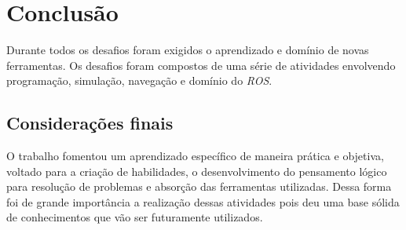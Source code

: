 \chapter{Conclusão}
\label{chap:conc}

Durante todos os desafios foram exigidos o aprendizado e domínio de novas ferramentas. Os desafios foram compostos de uma série de atividades envolvendo programação, simulação, navegação e domínio do \textit{ROS}. 



\section{Considerações finais}
\label{sec:consid}

O trabalho fomentou um aprendizado específico de maneira prática e objetiva, voltado para a criação de habilidades, o desenvolvimento do pensamento lógico para resolução de problemas e absorção das ferramentas utilizadas. Dessa forma foi de grande importância a realização dessas atividades pois deu uma base sólida de conhecimentos que vão ser futuramente utilizados.



